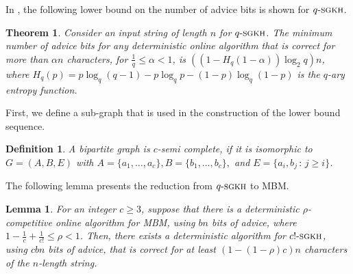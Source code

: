 \documentclass[a4paper]{article}
\newcommand{\qStr}{{q\text{-}\textsc{sgkh}}}
\newcommand{\cStr}{{c!\text{-}\textsc{sgkh}}}
\newtheorem{theorem}{Theorem}
\newtheorem{lemma}{Lemma}
\newtheorem{definition}{Definition}
\begin{document}
In \cite{bhkkss14}, the following lower bound on the number of advice bits is shown for $\qStr$.

\begin{theorem}{\textup{\cite{bhkkss14}}}\label{thm:BockThm}
  Consider an input string of length $n$ for $\qStr$. The minimum number of advice bits for any
  deterministic online algorithm that is correct for more than $\alpha n$ characters,
  for $\frac{1}{q} \le \alpha < 1$, is
  $((1 - H_q(1-\alpha))\log_2 q) n$, where $H_q(p) = p\log_q(q-1)-p\log_qp-(1-p)\log_q(1-p)$ is the
  $q$-ary entropy function.
\end{theorem}

First, we define a sub-graph that is used in the construction of the lower bound sequence.

\begin{definition}
 A bipartite graph is {\em $c$-semi complete}, if it is isomorphic to
 $G = (A, B, E)$ with $A = \{a_1, \dots, a_c\}, B = \{b_1, \dots, b_c\},$ and
 $E = \{ a_i, b_j \, : \, j \ge i \}$.
\end{definition}

The following lemma presents the reduction from $\qStr$ to \textsc{MBM}.

\begin{lemma}\label{lem:reduceMat}
  For an integer $c \ge 3$, suppose that there is a deterministic $\rho$-competitive online algorithm for
  \textsc{MBM}, using $bn$ bits of advice, where $1 - \frac{1}{c} + \frac{1}{c!} \le \rho < 1$.
  Then, there exists a deterministic algorithm for $\cStr$, using $cbn$ bits of advice, that is correct
  for at least $(1 - (1 - \rho)c)n$ characters of the $n$-length string.
\end{lemma}
\end{document}
